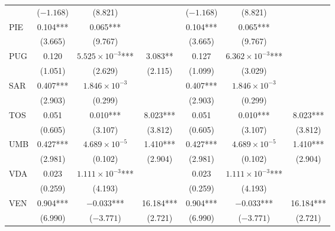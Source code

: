 \documentclass[12pt]{article}
\begin{document}
\begin{appendices}
\begin{longtable}{@{}lcccccc@{}}
             & ($-1.168$) & (8.821) &  & ($-1.168$) & (8.821) &    \\ 
            PIE & 0.104*** & 0.065*** &  & 0.104*** & 0.065*** &  \\ 
             & (3.665) & (9.767) &  & (3.665) & (9.767) &  \\ 
            PUG & 0.120 & $5.525 \times 10^{-3}$*** & 3.083** & 0.127 & $6.362 \times 10^{-3}$*** &  \\ 
             & (1.051) & (2.629) & (2.115) & (1.099) & (3.029) &  \\ 
            SAR & 0.407*** & $1.846 \times 10^{-3}$ &  & 0.407*** & $1.846 \times 10^{-3}$ &  \\ 
             & (2.903) & (0.299) &  & (2.903) & (0.299) &  \\ 
            TOS & 0.051 & 0.010*** & 8.023*** & 0.051 & 0.010*** & 8.023*** \\ 
             & (0.605) & (3.107) & (3.812) & (0.605) & (3.107) & (3.812) \\ 
            UMB & 0.427*** & $4.689 \times 10^{-5}$ & 1.410*** & 0.427*** & $4.689 \times 10^{-5}$ & 1.410*** \\ 
             & (2.981) & (0.102) & (2.904) & (2.981) & (0.102) & (2.904) \\ 
            VDA & 0.023 & $1.111 \times 10^{-3}$*** &  & 0.023 & $1.111 \times 10^{-3}$*** &  \\ 
             & (0.259) & (4.193) &  & (0.259) & (4.193) &  \\ 
            VEN & 0.904*** & $-0.033$*** & 16.184*** & 0.904*** & $-0.033$*** & 16.184*** \\
             & (6.990) & ($-3.771$) & (2.721) & (6.990) & ($-3.771$) & (2.721) \\* \bottomrule
    	\end{longtable}
		

\end{appendices}
\end{document}
